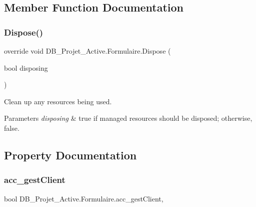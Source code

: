 \subsection{Member Function Documentation}
\mbox{\label{class_d_b___projet___active_1_1_formulaire_aa49cc659c830735a21144b79b9b1a30f}} 
\subsubsection{\texorpdfstring{Dispose()}{Dispose()}}
{\footnotesize\ttfamily override void D\+B\+\_\+\+Projet\+\_\+\+Active.\+Formulaire.\+Dispose (\begin{DoxyParamCaption}\item[{bool}]{disposing }\end{DoxyParamCaption})\hspace{0.3cm}{\ttfamily [protected]}}



Clean up any resources being used. 


\begin{DoxyParams}{Parameters}
{\em disposing} & true if managed resources should be disposed; otherwise, false.\\
\hline
\end{DoxyParams}


\subsection{Property Documentation}
\mbox{\label{class_d_b___projet___active_1_1_formulaire_a19eb646efbcaa6895cbc83cbcfde1fa5}} 
\subsubsection{\texorpdfstring{acc\_gestClient}{acc\_gestClient}}
{\footnotesize\ttfamily bool D\+B\+\_\+\+Projet\+\_\+\+Active.\+Formulaire.\+acc\+\_\+gest\+Client\hspace{0.3cm}{\ttfamily [get]}, {\ttfamily [set]}}

